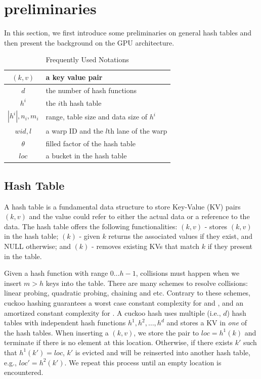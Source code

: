 \section{preliminaries}\label{sec:pre}
In this section, we first introduce some preliminaries on general hash tables and then present the background on the GPU architecture. 

\begin{table}
	\centering
	\caption{Frequently Used Notations}
	\label{tbl:stat:datasets}
	\begin{tabular}{|c|l|}
		\hline
		$(k,v)$ & a key value pair \\ \hline
		$d$		& the number of hash functions \\ \hline
		$h^i$	& the $i$th hash table \\ \hline
		$|h^i|,n_i,m_i$	& range, table size and data size of $h^i$ \\ \hline
		$wid,l$	& a warp ID and the $l$th lane of the warp \\ \hline
		$\theta$& filled factor of the hash table \\ \hline
		$loc$	& a bucket in the hash table \\ \hline
	\end{tabular}
\end{table}

\subsection{Hash Table}
A hash table is a fundamental data structure to store Key-Value (KV) pairs $(k,v)$ and the value could refer to either the actual data or a reference to the data.
The hash table offers the following functionalities: $(k,v)$ - stores $(k,v)$ in the hash table; $(k)$ - given $k$ returns the associated values if they exist, and NULL otherwise; and $(k)$ - removes existing KVs that match $k$ if they present in the table.

Given a hash function with range $0 \ldots h-1$, collisions must happen when we insert $m>h$ keys into the table. There are many schemes to resolve collisions: linear probing, quadratic probing, chaining and etc. Contrary to these schemes, cuckoo hashing \cite{pagh2004cuckoo} guarantees a worst case constant complexity for  and ,  and an amortized constant complexity for . A cuckoo hash uses multiple (i.e., $d$) hash tables with independent hash functions $h^1,h^2,\ldots,h^d$ and stores a KV in \emph{one} of the hash tables. When inserting a $(k,v)$, we store the pair to $loc=h^1(k)$ and terminate if there is no element at this location. Otherwise, if there exists $k'$ such that $h^1(k')=loc$, $k'$ is evicted and will be reinserted into another hash table, e.g., $loc'=h^2(k')$.
We repeat this process until an empty location is encountered.


